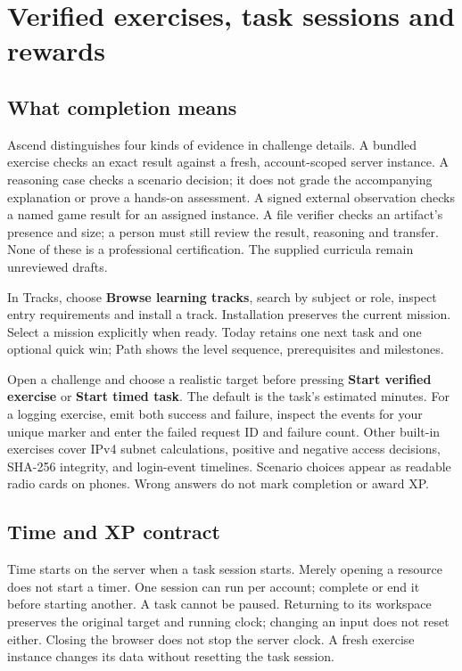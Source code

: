 \section{Verified exercises, task sessions and rewards}
\subsection{What completion means}
Ascend distinguishes four kinds of evidence in challenge details. A bundled exercise
checks an exact result against a fresh, account-scoped server instance. A reasoning
case checks a scenario decision; it does not grade the accompanying explanation or
prove a hands-on assessment. A signed external observation checks a named game result
for an assigned instance. A file verifier checks an artifact's presence and size;
a person must still review the result, reasoning and transfer. None of these is a
professional certification. The supplied curricula remain unreviewed drafts.

In Tracks, choose \textbf{Browse learning tracks}, search by subject or role, inspect
entry requirements and install a track. Installation preserves the current mission.
Select a mission explicitly when ready. Today retains one next task and one optional
quick win; Path shows the level sequence, prerequisites and milestones.

Open a challenge and choose a realistic target before pressing \textbf{Start verified
exercise} or \textbf{Start timed task}. The default is the task's estimated minutes.
For a logging exercise, emit both success and failure, inspect the events for your
unique marker and enter the failed request ID and failure count. Other built-in
exercises cover IPv4 subnet calculations, positive and negative access decisions,
SHA-256 integrity, and login-event timelines. Scenario choices appear as readable
radio cards on phones. Wrong answers do not mark completion or award XP.

\subsection{Time and XP contract}
Time starts on the server when a task session starts. Merely opening a resource does
not start a timer. One session can run per account; complete or end it before
starting another. A task cannot be paused. Returning to its workspace preserves
the original target and running clock; changing an input does not reset either.
Closing the browser does not stop the server clock. A fresh exercise instance
changes its data without resetting the task session.

